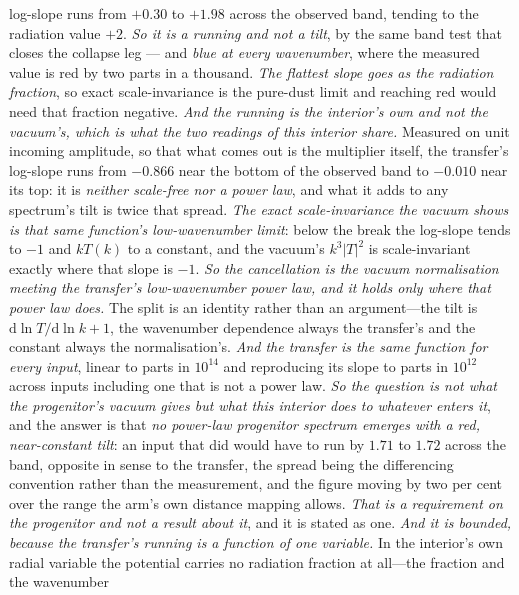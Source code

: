 \documentclass[11pt,a4paper]{article}
\theoremstyle{plain}
\theoremstyle{definition}
\theoremstyle{remark}
\newcommand{\dd}{\mathrm{d}}   %
\begin{document}
\begin{enumerate}
log-slope runs from $+0.30$ to $+1.98$ across the observed band, tending to the radiation value $+2$.
\emph{So it is a running and not a tilt}, by the same band test that closes the collapse leg --- and
\emph{blue at every wavenumber}, where the measured value is red by two parts in a
thousand. \emph{The flattest slope goes as the
radiation fraction}, so exact scale-invariance is the pure-dust limit and reaching red would need that
fraction negative. \emph{And the running is the interior's own and not the vacuum's, which is what the two readings of this
interior share.} Measured on unit incoming amplitude, so that what comes out is the multiplier itself, the
transfer's log-slope runs from $-0.866$ near the bottom of the observed band to $-0.010$ near its top: it is
\emph{neither scale-free nor a power law}, and what it adds to any spectrum's tilt is twice that spread.
\emph{The exact scale-invariance the vacuum shows is that same function's low-wavenumber limit}: below the
break the log-slope tends to $-1$ and $kT(k)$ to a constant, and the vacuum's $k^{3}|T|^{2}$ is
scale-invariant exactly where that slope is $-1$. \emph{So the cancellation is the vacuum normalisation
meeting the transfer's low-wavenumber power law, and it holds only where that power law does.} The split is
an identity rather than an argument---the tilt is $\dd\ln T/\dd\ln k+1$, the wavenumber dependence always
the transfer's and the constant always the normalisation's. \emph{And the transfer is the same function for
every input}, linear to parts in $10^{14}$ and reproducing its slope to parts in $10^{12}$ across inputs
including one that is not a power law.
\emph{So the question is not what the progenitor's vacuum gives but what this interior does to whatever
enters it}, and the answer is that \emph{no power-law progenitor spectrum emerges with a red, near-constant
tilt}: an input that did would have to run by $1.71$ to $1.72$ across the band, opposite in sense to the
transfer, the spread being the differencing convention rather than the measurement, and the figure moving
by two per cent over the range the arm's own distance mapping allows.
\emph{That is a requirement on the progenitor and not a result about it}, and it is stated as one.
\emph{And it is bounded, because the transfer's running is a function of one variable.} In the interior's
own radial variable the potential carries no radiation fraction at all---the fraction and the wavenumber

\end{enumerate}
\end{document}
